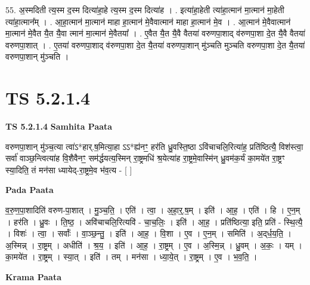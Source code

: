 \documentclass[17pt]{extarticle}
\begin{document}
55. अ॒स्मदिती त्य॒स्म द॒स्म दित्या॑हा॒हे त्य॒स्म द॒स्म दित्या॑ह । . इत्या॑हा॒हेती त्या॑हा॒त्मान॑ मा॒त्मान॑ मा॒हेती त्या॑हा॒त्मान᳚म् । . आ॒हा॒त्मान॑ मा॒त्मान॑ माहा हा॒त्मान॑ मे॒वैवात्मान॑ माहा हा॒त्मान॑ मे॒व । . आ॒त्मान॑ मे॒वैवात्मान॑ मा॒त्मान॑ मे॒वैत यै॒त यै॒वा त्मान॑ मा॒त्मान॑ मे॒वैतया᳚ । . ए॒वैत यै॒त यै॒वै वैतया॑ वरुणपा॒शाद् व॑रुणपा॒शा दे॒त यै॒वै वैतया॑ वरुणपा॒शात् । . ए॒तया॑ वरुणपा॒शाद् व॑रुणपा॒शा दे॒त यै॒तया॑ वरुणपा॒शान् मु॑ञ्चति मुञ्चति वरुणपा॒शा दे॒त यै॒तया॑ वरुणपा॒शान् मु॑ञ्चति । \newline
\pagebreak
{}

\section{ TS 5.2.1.4 }

\textbf{TS 5.2.1.4 } \newline
\textbf{Samhita Paata} \newline

वरुणपा॒शान् मु॑ञ्च॒त्या त्वा॑ऽ*हार्.ष॒मित्या॒हा ऽऽ*ह्य॑नꣳ॒॒ हर॑ति ध्रु॒वस्ति॒ष्ठा ऽवि॑चाचलि॒रित्या॑ह॒ प्रति॑ष्ठित्यै॒ विश॑स्त्वा॒ सर्वा॑ वाञ्छ॒न्त्वित्या॑ह वि॒शैवैनꣳ॒॒ सम॑र्द्धयत्य॒स्मिन् रा॒ष्ट्रमधि॑ श्र॒येत्या॑ह रा॒ष्ट्रमे॒वास्मि॑न् ध्रु॒वम॑क॒र्यं का॒मये॑त रा॒ष्ट्रꣳ स्या॒दिति॒ तं मन॑सा ध्यायेद्-रा॒ष्ट्रमे॒व भ॑व॒त्य - [  ] \newline

\textbf{Pada Paata} \newline

व॒रु॒ण॒पा॒शादिति॑ वरुण-पा॒शात् । मु॒ञ्च॒ति॒ । एति॑ । त्वा॒ । अ॒हा॒र्॒.ष॒म् । इति॑ । आ॒ह॒ । एति॑ । हि । ए॒न॒म् । हर॑ति । ध्रु॒वः । ति॒ष्ठ॒ । अवि॑चाचलि॒रित्यवि॑ - चा॒च॒लिः॒ । इति॑ । आ॒ह॒ । प्रति॑ष्ठित्या॒ इति॒ प्रति॑ - स्थि॒त्यै॒ । विशः॑ । त्वा॒ । सर्वाः᳚ । वा॒ञ्छ॒न्तु॒ । इति॑ । आ॒ह॒ । वि॒शा । ए॒व । ए॒न॒म् । समिति॑ । अ॒द्‌र्ध॒य॒ति॒ । अ॒स्मिन्न् । रा॒ष्ट्रम् । अधीति॑ । श्र॒य॒ । इति॑ । आ॒ह॒ । रा॒ष्ट्रम् । ए॒व । अ॒स्मि॒न्न् । ध्रु॒वम् । अ॒कः॒ । यम् । का॒मये॑त । रा॒ष्ट्रम् । स्या॒त् । इति॑ । तम् । मन॑सा । ध्या॒ये॒त् । रा॒ष्ट्रम् । ए॒व । भ॒व॒ति॒ ।  \newline


\textbf{Krama Paata} \newline
\end{document}
